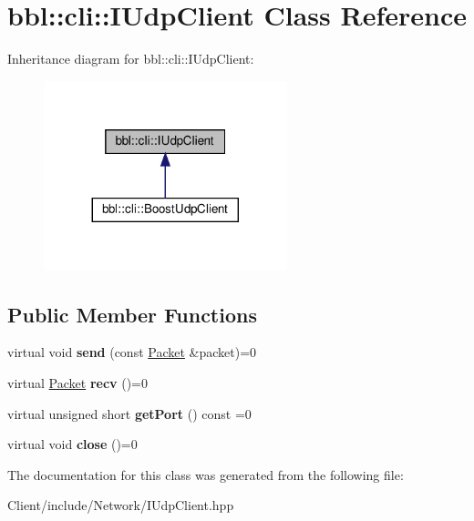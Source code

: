 \hypertarget{classbbl_1_1cli_1_1_i_udp_client}{}\section{bbl\+:\+:cli\+:\+:I\+Udp\+Client Class Reference}
\label{classbbl_1_1cli_1_1_i_udp_client}


Inheritance diagram for bbl\+:\+:cli\+:\+:I\+Udp\+Client\+:
\nopagebreak
\begin{figure}[H]
\begin{center}
\leavevmode
\includegraphics[width=200pt]{classbbl_1_1cli_1_1_i_udp_client__inherit__graph}
\end{center}
\end{figure}
\subsection*{Public Member Functions}
\begin{DoxyCompactItemize}
\item 
\mbox{\label{classbbl_1_1cli_1_1_i_udp_client_a363210532b30e3d9d3fb8027afe1966d}} 
virtual void {\bfseries send} (const \hyperlink{classbbl_1_1cli_1_1_packet}{Packet} \&packet)=0
\item 
\mbox{\label{classbbl_1_1cli_1_1_i_udp_client_a05160445368a5b5d383071e5f5bdd0ce}} 
virtual \hyperlink{classbbl_1_1cli_1_1_packet}{Packet} {\bfseries recv} ()=0
\item 
\mbox{\label{classbbl_1_1cli_1_1_i_udp_client_a4b4427523117a063cae8044111326887}} 
virtual unsigned short {\bfseries get\+Port} () const =0
\item 
\mbox{\label{classbbl_1_1cli_1_1_i_udp_client_a3106102e589e98e357a3a7d555f21813}} 
virtual void {\bfseries close} ()=0
\end{DoxyCompactItemize}


The documentation for this class was generated from the following file\+:\begin{DoxyCompactItemize}
\item 
Client/include/\+Network/I\+Udp\+Client.\+hpp\end{DoxyCompactItemize}
